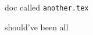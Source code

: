 \documentclass{article}
\begin{document}
doc called \verb|another.tex|

should've been all
\end{document}
